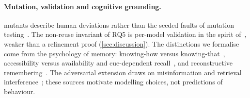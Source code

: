 \paragraph{Mutation, validation and cognitive grounding.} \XMen{} mutants describe human deviations rather than the seeded faults of mutation testing~\cite{demillo1978hints,jia2011analysis}. The non-reuse invariant of RQ5 is per-model validation in the spirit of~\cite{pnueli1998translation}, weaker than a refinement proof (\cref{sec:discussion}). The distinctions we formalise come from the psychology of memory: knowing-how versus knowing-that~\cite{ryle1949concept,cohen1980preserved,anderson1982acquisition}, accessibility versus availability and cue-dependent recall~\cite{tulving1974cue,tulving1973encoding}, and reconstructive remembering~\cite{bartlett1995remembering,schacter1999seven}. The adversarial extension draws on misinformation and retrieval interference~\cite{loftus2005planting,anderson1994remembering};  these sources motivate modelling choices, not predictions of behaviour.
